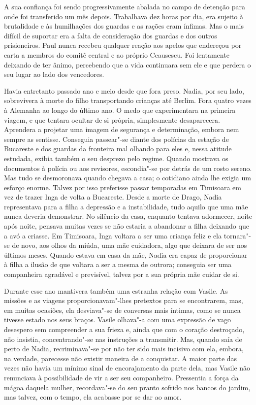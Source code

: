 A sua confiança foi sendo progressivamente abalada no campo de detenção
para onde foi transferido um mês depois. Trabalhava dez horas por dia,
era sujeito à brutalidade e às humilhações dos guardas e as rações
eram ínfimas. Mas o mais difícil de suportar era a falta de consideração dos guardas e dos outros prisioneiros. Paul nunca recebeu
qualquer reação aos apelos que endereçou por carta a membros do comitê
central e ao próprio Ceausescu. Foi lentamente deixando de ter ânimo,
percebendo que a vida continuara sem ele e que perdera o seu lugar ao
lado dos vencedores.

Havia entretanto passado ano e meio desde que fora preso. Nadia, por seu
lado, sobrevivera à morte do filho transportando crianças até Berlim.
Fora quatro vezes à Alemanha ao longo do último ano. O medo que
experimentara na primeira viagem, e que tentara ocultar de si própria,
simplesmente desaparecera. Aprendera a projetar uma imagem de segurança
e determinação, embora nem sempre as sentisse. Conseguia passear"-se
diante dos polícias da
estação de Bucareste e dos guardas da fronteira mal olhando para eles e,
nessa atitude estudada, exibia também o seu desprezo pelo regime. Quando
mostrava os documentos à polícia ou aos revisores, escondia"-se por
detrás de um rosto sereno. Mas tudo se desmoronava quando chegava a
casa; o cotidiano ainda lhe exigia um esforço enorme. Talvez por isso
preferisse passar temporadas em Timisoara em vez de trazer Inga de volta
a Bucareste. Desde a morte de Drago, Nadia representava para a filha a
depressão e a instabilidade, tudo aquilo que uma mãe nunca deveria
demonstrar. No silêncio da casa, enquanto tentava adormecer, noite após
noite, pensava muitas vezes se não estaria a abandonar a filha deixando
que a avó a criasse. Em Timisoara, Inga voltara a ser uma criança feliz
e ela tornara"-se de novo, aos olhos da miúda, uma mãe cuidadora, algo
que deixara de ser nos últimos meses. Quando estava em casa da mãe,
Nadia era capaz de proporcionar à filha a ilusão de que voltara a ser a
mesma de outrora; conseguia ser uma companheira agradável e
previsível, talvez por a sua própria mãe cuidar de si.

Durante esse ano mantivera também uma estranha
relação com Vasile. As missões e as viagens proporcionavam"-lhes pretextos para se encontrarem, mas, em muitas ocasiões, ela
desviava"-se de conversas mais íntimas, como se nunca tivesse estado nos
seus braços. Vasile olhava"-a com uma expressão de vago desespero sem
compreender a sua frieza e, ainda que com o coração destroçado, não
insistia, concentrando"-se nas instruções a transmitir. Mas, quando saía
de perto de Nadia, recriminava"-se por não ter sido mais incisivo com
ela, embora, na verdade, parecesse não
existir maneira de a conquistar. A maior parte das vezes não havia um
mínimo sinal de encorajamento da parte dela, mas Vasile não renunciava à
possibilidade de vir a ser seu companheiro. Pressentia a força da mágoa
daquela mulher, recordava"-se do seu pranto sofrido nos bancos do jardim,
mas talvez, com o tempo, ela acabasse por se dar ao amor.

